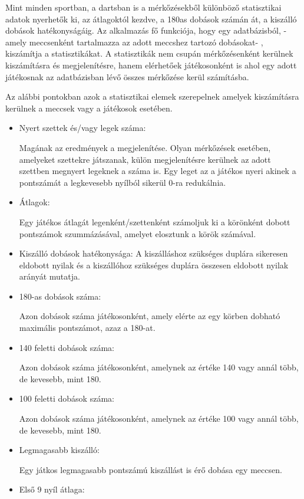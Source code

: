 Mint minden sportban, a dartsban is a mérkőzésekből különböző statisztikai adatok nyerhetők ki, az átlagoktól kezdve, a 180as dobások számán át, a kiszálló dobások hatékonyságáig. Az alkalmazás fő funkciója, hogy egy adatbázisból, - amely meccsenként tartalmazza az adott meccshez tartozó dobásokat- , kiszámítja a statisztikákat. A statisztikák nem csupán mérkőzésenként kerülnek kiszámításra és megjelenítésre, hanem elérhetőek játékosonként is ahol egy adott játékosnak az adatbázisban lévő összes mérkőzése kerül számításba.

Az alábbi pontokban azok a statisztikai elemek szerepelnek amelyek kiszámításra kerülnek a meccsek vagy a játékosok esetében.

\begin{itemize}
\item Nyert szettek és/vagy legek száma:

Magának az eredmények a megjelenítése. Olyan mérkőzések esetében, amelyeket szettekre játszanak, külön megjelenítésre kerülnek az adott szettben megnyert legeknek a száma is. Egy leget az a játékos nyeri akinek a pontszámát a legkevesebb nyílból sikerül 0-ra redukálnia.
\item Átlagok:

Egy játékos átlagát legenként/szettenként számoljuk ki a körönként dobott pontszámok szummázásával, amelyet elosztunk a körök számával.
\item Kiszálló dobások hatékonysága:
A kiszálláshoz szükséges duplára sikeresen eldobott nyilak és a kiszállóhoz szükséges duplára összesen eldobott nyilak arányát mutatja.
\item 180-as dobások száma:

Azon dobások száma játékosonként, amely elérte az egy körben dobható maximális pontszámot, azaz a 180-at.
\item 140 feletti dobások száma:

Azon dobások száma játékosonként, amelynek az értéke 140 vagy annál több, de kevesebb, mint 180.
\item 100 feletti dobások száma:

Azon dobások száma játékosonként, amelynek az értéke 100 vagy annál több, de kevesebb, mint 180.
\item Legmagasabb kiszálló:

Egy játkos legmagasabb pontszámú kiszállást is érő dobása egy meccsen.
\item Első 9 nyíl átlaga:


\end{itemize}
